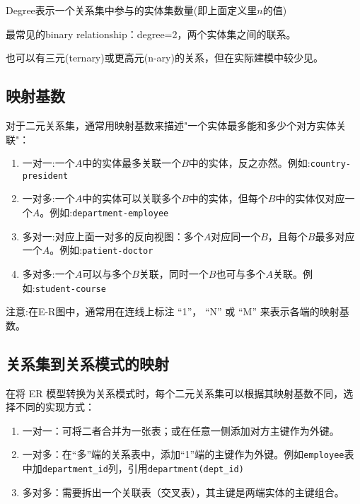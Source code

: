 Degree表示一个关系集中参与的实体集数量(即上面定义里$n$的值)

最常见的binary relationship：degree=2，两个实体集之间的联系。

也可以有三元(ternary)或更高元(n-ary)的关系，但在实际建模中较少见。

\subsection{映射基数}

对于二元关系集，通常用映射基数来描述"一个实体最多能和多少个对方实体关联"：
\begin{enumerate}
    \item 一对一:一个$A$中的实体最多关联一个$B$中的实体，反之亦然。例如:\texttt{country-president}
    \item 一对多:一个$A$中的实体可以关联多个$B$中的实体，但每个$B$中的实体仅对应一个$A$。例如:\texttt{department-employee}
    \item 多对一:对应上面一对多的反向视图：多个$A$对应同一个$B$，且每个$B$最多对应一个$A$。例如:\texttt{patient-doctor}
    \item 多对多:一个$A$可以与多个$B$关联，同时一个$B$也可与多个$A$关联。例如:\texttt{student-course}
\end{enumerate}

注意:在E-R图中，通常用在连线上标注 “1”， “N” 或 “M” 来表示各端的映射基数。

\subsection{关系集到关系模式的映射}

在将 ER 模型转换为关系模式时，每个二元关系集可以根据其映射基数不同，选择不同的实现方式：

\begin{enumerate}
    \item 一对一：可将二者合并为一张表；或在任意一侧添加对方主键作为外键。
    \item 一对多：在“多”端的关系表中，添加“1”端的主键作为外键。例如\texttt{employee}表中加\texttt{department\_id}列，引用\texttt{department(dept\_id)}
    \item 多对多：需要拆出一个关联表（交叉表），其主键是两端实体的主键组合。
\end{enumerate}